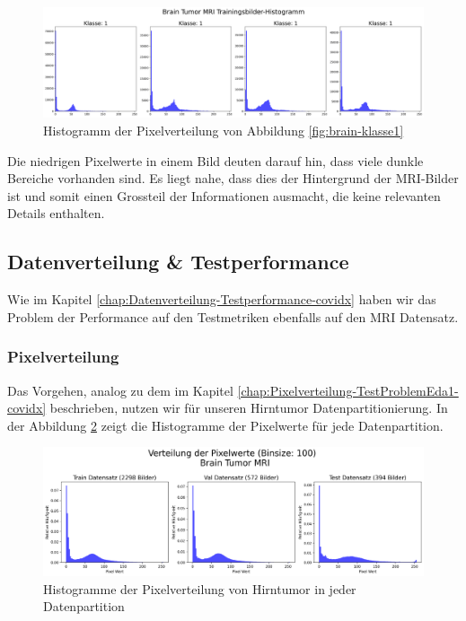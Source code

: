 \begin{figure}[ht]
    \centering
    \includegraphics[width=\linewidth]{01-images/03-data/brain-klasse1-hist.png}
    \caption{Histogramm der Pixelverteilung von Abbildung \ref{fig:brain-klasse1}}
    \label{fig:brain-klasse1-hist}
\end{figure}

Die niedrigen Pixelwerte in einem Bild deuten darauf hin, dass viele dunkle Bereiche vorhanden sind. Es liegt nahe, dass dies der Hintergrund der MRI-Bilder ist und somit einen Grossteil der Informationen ausmacht, die keine relevanten Details enthalten.



\subsection{Datenverteilung \& Testperformance} \label{chap:Datenverteilung-Testperformance-mri}

Wie im Kapitel \ref{chap:Datenverteilung-Testperformance-covidx} haben wir das Problem der Performance auf den Testmetriken ebenfalls auf den MRI Datensatz. 

\subsubsection{Pixelverteilung} \label{chap:Pixelverteilung-TestProblemEda1-mri}

Das Vorgehen, analog zu dem im Kapitel \ref{chap:Pixelverteilung-TestProblemEda1-covidx} beschrieben, nutzen wir für unseren Hirntumor Datenpartitionierung. In der Abbildung \ref{fig:hist-datapartition-brain} zeigt die Histogramme der Pixelwerte für jede Datenpartition.

\begin{figure}[ht]
    \centering
    \includegraphics[width=\linewidth]{01-images/03-data/brain-Pixelverteilung-Partitionen.png}
    \caption{Histogramme der Pixelverteilung von Hirntumor in jeder Datenpartition}
    \label{fig:hist-datapartition-brain}
\end{figure}

